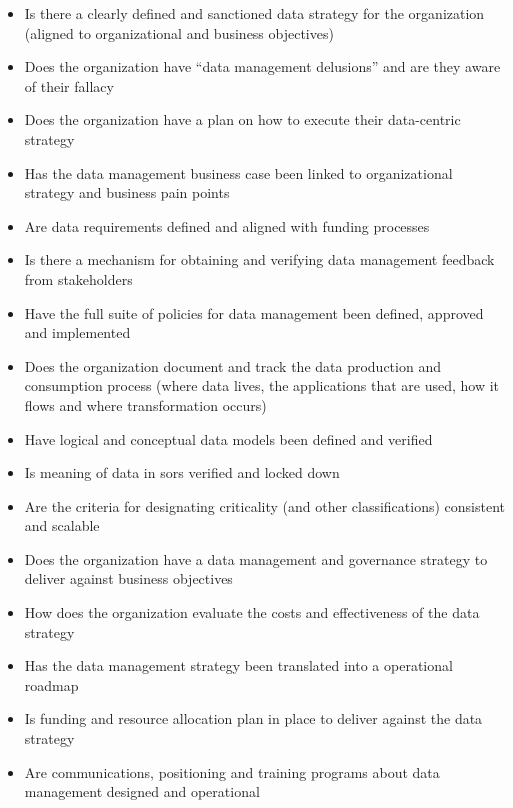 \begin{description}[nosep,font=\bfseries]
  \begin{itemize}
    \item Is there a clearly defined and sanctioned data strategy for the organization (aligned to organizational and business objectives)
    \item Does the organization have “data management delusions” and are they aware of their fallacy
    \item Does the organization have a plan on how to execute their data-centric strategy
    \item Has the data management business case been linked to organizational strategy and business pain points
    \item Are data requirements defined and aligned with funding processes
    \item Is there a mechanism for obtaining and verifying data management feedback from stakeholders
    \item Have the full suite of policies for data management been defined, approved and implemented
    \item Does the organization document and track the data production and consumption process
          (where data lives, the applications that are used, how it flows and where transformation occurs)
    \item Have logical and conceptual data models been defined and verified
    \item Is meaning of data in \glspl{sor} verified and locked down
    \item Are the criteria for designating criticality (and other classifications) consistent and scalable
    \item Does the organization have a data management and governance strategy to deliver against business objectives
    \item How does the organization evaluate the costs and effectiveness of the data strategy
    \item Has the data management strategy been translated into a operational roadmap
    \item Is funding and resource allocation plan in place to deliver against the data strategy
    \item Are communications, positioning and training programs about data management designed and operational
  \end{itemize}
\end{description}










